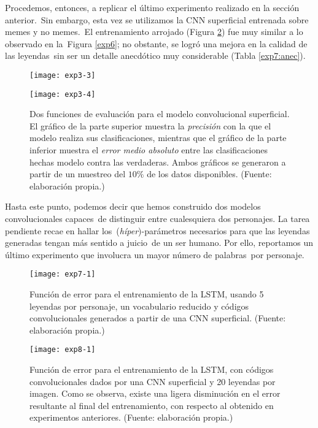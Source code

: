Procedemos, entonces, a replicar el último experimento realizado en la sección anterior.\
Sin embargo, esta vez se utilizamos la CNN superficial entrenada sobre memes y no memes.\
El entrenamiento arrojado (Figura \ref{exp7}) fue muy similar a lo observado en la\
Figura \ref{exp6}; no obstante, se logró una mejora en la calidad de las leyendas\
sin ser un detalle anecdótico muy considerable (Tabla \ref{exp7:anec}).

\begin{figure}[H]
  \centering
  \begin{minipage}[c]{\linewidth}
    \texttt{[image: exp3-3]}
  \end{minipage}\hfill
  \begin{minipage}[c]{\linewidth}
    \texttt{[image: exp3-4]}
  \end{minipage}
  \caption{
    Dos funciones de evaluación para el modelo convolucional superficial.
    El gráfico de la parte superior muestra la \emph{precisión} con la que el modelo realiza
    sus clasificaciones, mientras que el gráfico de la parte inferior muestra el
    \emph{error medio absoluto} entre las clasificaciones hechas modelo contra las verdaderas.
    Ambos gráficos se generaron a partir de un muestreo del $10\%$ de los datos disponibles.
    (Fuente: elaboración propia.)
  }
  \label{eval:exp3}
\end{figure}

Hasta este punto, podemos decir que hemos construido dos modelos convolucionales capaces\
de distinguir entre cualesquiera dos personajes. La tarea pendiente recae en hallar los\
(\emph{híper})-parámetros necesarios para que las leyendas generadas tengan más sentido a juicio\
de un ser humano. Por ello, reportamos un último experimento que involucra un mayor número de palabras\
por personaje.

\begin{figure}[H]
  \texttt{[image: exp7-1]}
  \caption{
    Función de error para el entrenamiento de la LSTM, usando 5 leyendas por personaje,
    un vocabulario reducido y códigos convolucionales generados a partir de una CNN superficial.
    (Fuente: elaboración propia.)
  }
  \label{exp7}
\end{figure}

\begin{figure}[H]
  \texttt{[image: exp8-1]}
  \caption{
    Función de error para el entrenamiento de la LSTM, con códigos convolucionales dados
    por una CNN superficial y 20 leyendas por imagen. Como se observa, existe una ligera
    disminución en el error resultante al final del entrenamiento, con respecto al obtenido
    en experimentos anteriores.
    (Fuente: elaboración propia.)
  }
  \label{exp8}
\end{figure}

